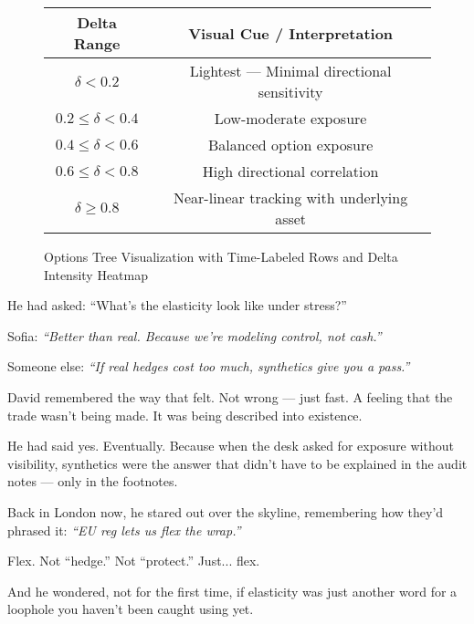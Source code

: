 \begin{figure}[H]
\begin{tikzpicture}
    \end{tikzpicture}
  
    \vspace{1em}
  
    \begin{tabular}{|c|c|}
      \hline
      \textbf{Delta Range} & \textbf{Visual Cue / Interpretation} \\
      \hline
      $\delta < 0.2$ & \cellcolor{black!5} Lightest — Minimal directional sensitivity \\
      $0.2 \leq \delta < 0.4$ & \cellcolor{red!20} Low-moderate exposure \\
      $0.4 \leq \delta < 0.6$ & \cellcolor{red!40} Balanced option exposure \\
      $0.6 \leq \delta < 0.8$ & \cellcolor{red!60} High directional correlation \\
      $\delta \geq 0.8$ & \cellcolor{red!80} Near-linear tracking with underlying asset \\
      \hline
    \end{tabular}
  
    \caption{Options Tree Visualization with Time-Labeled Rows and Delta Intensity Heatmap}
\end{figure}



\medskip


He had asked:
“What's the elasticity look like under stress?”

Sofia:
\textit{“Better than real. Because we’re modeling control, not cash.”}

Someone else:
\textit{“If real hedges cost too much, synthetics give you a pass.”}

David remembered the way that felt. Not wrong — just fast.
A feeling that the trade wasn't being made. It was being described into existence.

He had said yes. Eventually.
Because when the desk asked for exposure without visibility,
synthetics were the answer that didn’t have to be explained in the audit notes —
only in the footnotes.

\medskip

Back in London now, he stared out over the skyline,
remembering how they’d phrased it:
\textit{“EU reg lets us flex the wrap.”}

Flex. Not “hedge.” Not “protect.”
Just... flex.

And he wondered, not for the first time,
if elasticity was just another word for a loophole
you haven't been caught using yet.


